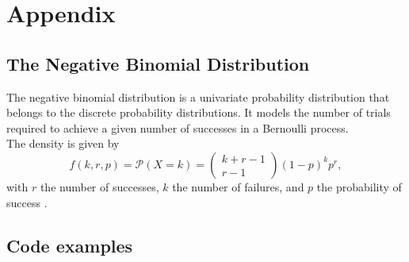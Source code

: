 %
\chapter{Appendix}
\label{sec:appendix}

\section{The Negative Binomial Distribution}
The negative binomial distribution is a univariate probability distribution that belongs to the discrete probability distributions. It models the number of trials required to achieve a given number of successes in a Bernoulli process. \\
The density is given by
\begin{equation}
    f\left(k,r,p\right)=\mathcal{P}\left(X=k\right)=\begin{pmatrix} k+r-1\\r-1\end{pmatrix}\left(1-p\right)^kp^r,
\end{equation}
with $r$ the number of successes, $k$ the number of failures, and $p$ the probability of success \cite{haldane1941fitting}.

\section{Code examples}
